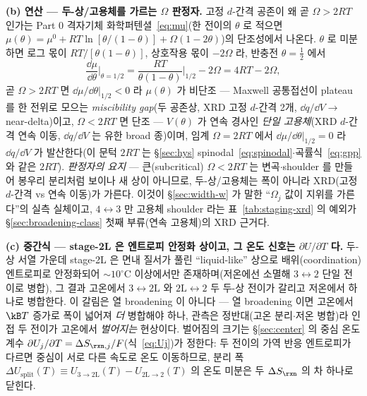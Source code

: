 \textbf{(b) 연산 --- 두-상/고용체를 가르는 $\Omega$ 판정자.} 고정 $d$-간격 공존이 왜 곧 $\Omega\!>\!2RT$ 인가는
Part 0 격자기체 화학퍼텐셜~\eqref{eq:mu}(한 전이의 $\theta$ 로 적으면 $\mu(\theta)=\mu^0+RT\ln[\theta/(1-\theta)]
+\Omega(1-2\theta)$)의 단조성에서 나온다. $\theta$ 로 미분하면 로그 몫이 $RT/[\theta(1-\theta)]$, 상호작용 몫이
$-2\Omega$ 라, 반충전 $\theta=\tfrac12$ 에서
\begin{equation}
\frac{\dd\mu}{\dd\theta}\bigg|_{\theta=1/2}=\frac{RT}{\theta(1-\theta)}\bigg|_{1/2}-2\Omega=4RT-2\Omega,
\label{eq:staging-mujudge}
\end{equation}
곧 $\Omega\!>\!2RT$ 면 $\dd\mu/\dd\theta|_{1/2}\!<\!0$ 라 $\mu(\theta)$ 가 비단조 --- Maxwell 공통접선이 plateau 를 한
전위로 모으는 \emph{miscibility gap}(두 공존상, XRD 고정 $d$-간격 2개, $\dd q/\dd V\!\to\!$near-delta)이고,
$\Omega\!<\!2RT$ 면 단조 --- $V(\theta)$ 가 연속 경사인 \emph{단일 고용체}(XRD $d$-간격 연속 이동, $\dd q/\dd V$ 는
유한 broad 종)이며, 임계 $\Omega\!=\!2RT$ 에서 $\dd\mu/\dd\theta|_{1/2}\!=\!0$ 라 $\dd q/\dd V$ 가 발산한다(이 문턱
$2RT$ 는 \S\ref{sec:hys} spinodal~\eqref{eq:spinodal}$\cdot$곡률식~\eqref{eq:gpp} 와 같은 $2RT$). \emph{판정자의
요지} --- 큰(subcritical) $\Omega\!<\!2RT$ 는 변곡$\cdot$shoulder 를 만들어 봉우리 분리처럼 보이나 새 상이 아니므로,
두-상/고용체는 폭이 아니라 XRD(고정 $d$-간격 vs 연속 이동)가 가른다\cite{dahn1991}. 이것이 \S\ref{sec:width-w} 가
말한 ``$\Omega_j$ 값이 지위를 가른다''의 실측 실체이고, $4\!\leftrightarrow\!3$ 만 고용체 shoulder 라는
표~\ref{tab:staging-xrd} 의 예외가 \S\ref{sec:broadening-class} 첫째 부류(연속 고용체)의 XRD 근거다.

\textbf{(c) 중간식 --- stage-2L 은 엔트로피 안정화 상이고, 그 온도 신호는 $\partial U/\partial T$ 다.} 두-상 서열
가운데 stage-2L 은 면내 질서가 풀린 ``liquid-like'' 상으로 배위(coordination) 엔트로피로 안정화되어
$\sim\!10^\circ$C 이상에서만 존재하며(저온에선 소멸해 $3\!\leftrightarrow\!2$ 단일 전이로 병합), 그 결과 고온에서
$3\!\leftrightarrow\!2\mathrm L$ 와 $2\mathrm L\!\leftrightarrow\!2$ 두 두-상 전이가 갈리고 저온에서 하나로 병합한다\cite{dahn1991}.
이 갈림은 열 broadening 이 아니다 --- 열 broadening 이면 고온에서 $\kB T$ 증가로 폭이 넓어져 \emph{더} 병합해야
하나, 관측은 정반대(고온 분리$\cdot$저온 병합)라 인접 두 전이가 고온에서 \emph{벌어지는} 현상이다. 벌어짐의
크기는 \S\ref{sec:center} 의 중심 온도계수 $\partial U_j/\partial T=\Delta S_{\rxn,j}/F$(식~\eqref{eq:Uj})가
정한다: 두 전이의 가역 반응 엔트로피가 다르면 중심이 서로 다른 속도로 온도 이동하므로, 분리 폭
$\Delta U_\mathrm{split}(T)\equiv U_{3\to2\mathrm L}(T)-U_{2\mathrm L\to2}(T)$ 의 온도 미분은 두 $\Delta S_\rxn$ 의
차 하나로 닫힌다.

